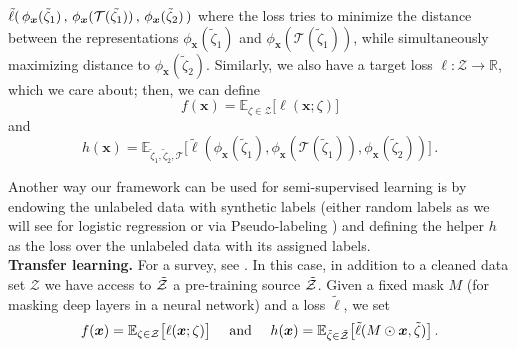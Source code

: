 \documentclass[10pt]{article} %
\newcommand{\comment}[1]{}
\theoremstyle{plain}
\theoremstyle{definition}
\theoremstyle{remark}
\newcommand{\norm}[1]{\|#1\|_2}
\def\vx{{\bm{x}}}
\newcommand{\E}{\mathbb{E}}
\newcommand{\R}{\mathbb{R}}
\begin{document}
\(
    \Tilde{\ell}(\, \phi_{\vx}(\tilde\zeta_1)\,,\, \phi_{\vx}(\mathcal{T}(\Tilde{\zeta_1}))\,,\, \phi_{\vx}(\tilde\zeta_2)\,)  
\) where the loss tries to minimize the distance between the representations $\phi_{\vx}(\tilde\zeta_1)$ and $\phi_{\vx}(\mathcal{T}(\tilde\zeta_1))$, while simultaneously maximizing distance to $\phi_{\vx}(\tilde\zeta_2)$. Similarly, we also have a target loss $\ell: \mathcal{Z} \rightarrow \R$, which we care about; then, we can define
\[
    f(\vx) =   \E_{\zeta \in \mathcal{Z}}\big[{\ell(\vx; \zeta)}\big]\] and \[ h(\vx) = \E_{\tilde\zeta_1, \tilde\zeta_2, \mathcal{T}}\big[\tilde\ell(\phi_{\vx}(\tilde\zeta_1), \phi_{\vx}(\mathcal{T}(\tilde\zeta_1)), \phi_{\vx}(\tilde\zeta_2))\big]\,.
\]

Another way our framework can be used for semi-supervised learning is by endowing the unlabeled data with synthetic labels (either random labels as we will see for logistic regression or via Pseudo-labeling \citep{Pseudolabeling}) and defining the helper $h$ as the loss over the unlabeled data with its assigned labels. \\
\comment{The quality of the auxiliary unsupervised task can then be quantified as the Hessian distance
$
    \norm{\nabla^2 f(\vx) - \nabla^2 h(\vx)} \leq \delta\,.
$
Perhaps unintuitively, this is the \emph{only} measure of similarity we need between the target task and the auxiliary source task. In particular, we do not need the optimum parameters to be related in any other manner. We hope this relaxation of the similarity requirements would allow for a more flexible design of the unsupervised source tasks.\\}
\textbf{Transfer learning.} For a survey, see \citep{TLsurvey}. In this case, in addition to a cleaned data set $\mathcal{Z}$ we have access to  $\Tilde{\mathcal{Z}}$ a pre-training source $\Tilde{\mathcal{Z}}$. Given a fixed mask $M$ (for masking deep layers in a neural network) and a loss $\tilde\ell$, we set 
\[
    f(\vx) =   \E_{\zeta \in \mathcal{Z}}\big[{\ell(\vx; \zeta)}\big] \quad \text{ and } \quad h(\vx) = \E_{\tilde\zeta\in \Tilde{\mathcal{Z}}}\big[\tilde\ell(M\odot\vx, \tilde\zeta )\big]\,.
\]
\comment{Again, we quantify the quality of the transfer using the hessian distance.\\}
\end{document}

